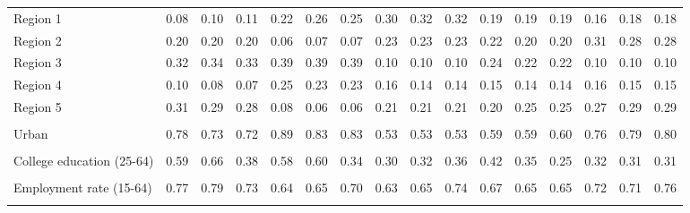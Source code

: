 \begin{tabular}{l*{15}{c}}
\\
Region 1 & 0.08 & 0.10 & 0.11 & 0.22 & 0.26 & 0.25 & 0.30 & 0.32 & 0.32 & 0.19 & 0.19 & 0.19 & 0.16 & 0.18 & 0.18 \\
Region 2 & 0.20 & 0.20 & 0.20 & 0.06 & 0.07 & 0.07 & 0.23 & 0.23 & 0.23 & 0.22 & 0.20 & 0.20 & 0.31 & 0.28 & 0.28 \\
Region 3 & 0.32 & 0.34 & 0.33 & 0.39 & 0.39 & 0.39 & 0.10 & 0.10 & 0.10 & 0.24 & 0.22 & 0.22 & 0.10 & 0.10 & 0.10 \\
Region 4 & 0.10 & 0.08 & 0.07 & 0.25 & 0.23 & 0.23 & 0.16 & 0.14 & 0.14 & 0.15 & 0.14 & 0.14 & 0.16 & 0.15 & 0.15  \\
Region 5 & 0.31 & 0.29 & 0.28 & 0.08 & 0.06 & 0.06 & 0.21 & 0.21 & 0.21 & 0.20 & 0.25 & 0.25 & 0.27 & 0.29 & 0.29 \\
\\
Urban & 0.78 & 0.73 & 0.72 & 0.89 & 0.83 & 0.83 & 0.53 & 0.53 & 0.53 & 0.59 & 0.59 & 0.60 & 0.76 & 0.79 & 0.80 \\
\\
College education (25-64) & 0.59 & 0.66 & 0.38 & 0.58 & 0.60 & 0.34 & 0.30 & 0.32 & 0.36 & 0.42 & 0.35 & 0.25 & 0.32 & 0.31 & 0.31\\
\\
Employment rate (15-64) & 0.77 & 0.79 & 0.73 & 0.64 & 0.65 & 0.70 & 0.63 & 0.65 & 0.74 & 0.67 & 0.65 & 0.65 & 0.72 & 0.71 & 0.76 \\
\\
\bottomrule
\end{tabular}